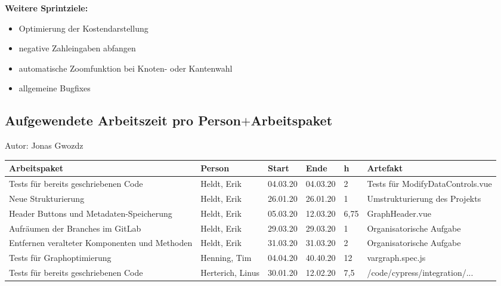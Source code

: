 \textbf{Weitere Sprintziele:}
\begin{itemize}
\item Optimierung der Kostendarstellung
\item negative Zahleingaben abfangen
\item automatische Zoomfunktion bei Knoten- oder Kantenwahl
\item allgemeine Bugfixes
\end{itemize}


\subsection{Aufgewendete Arbeitszeit pro Person$+$Arbeitspaket}
{\small Autor: Jonas Gwozdz}

\begin{longtable}{|p{4cm}|p{2cm}|p{1.2cm}|p{1.2cm}|p{0.7cm}|p{3.8cm}|}
  \hline
  Arbeitspaket                                                          & Person                & Start    & Ende     & h     & Artefakt                                                    \\
  \hline
  Tests für bereits geschriebenen Code                                  & Heldt, Erik           & 04.03.20 & 04.03.20 & 2     & Tests für ModifyDataControls.vue                            \\ \hline
  Neue Strukturierung                                                   & Heldt, Erik           & 26.01.20 & 26.01.20 & 1     & Umstrukturierung des Projekts                               \\ \hline
  Header Buttons und Metadaten-Speicherung                              & Heldt, Erik           & 05.03.20 & 12.03.20 & 6,75  & GraphHeader.vue                                             \\ \hline
  Aufräumen der Branches im GitLab                                      & Heldt, Erik           & 29.03.20 & 29.03.20 & 1     & Organisatorische Aufgabe                               \\ \hline
  Entfernen veralteter Komponenten und Methoden                         & Heldt, Erik           & 31.03.20 & 31.03.20 & 2     & Organisatorische Aufgabe                                             \\ \hline
  Tests für Graphoptimierung                                            & Henning, Tim          & 04.04.20 & 40.40.20 & 12    & vargraph.spec.js        \\ \hline
  Tests für bereits geschriebenen Code                                  & Herterich, Linus      & 30.01.20 & 12.02.20 & 7,5   & /code/cypress/integration/...                                     \\ \hline

\end{longtable}
